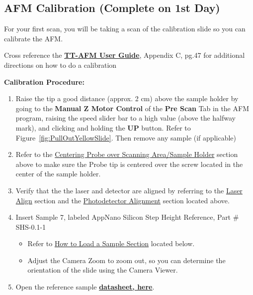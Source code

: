 \documentclass{../lab}
\begin{document}
\subsection{AFM Calibration (Complete on 1st Day)}

For your first scan, you will be taking a scan of the calibration slide so you can calibrate the AFM.

Cross reference the \href{http://experimentationlab.berkeley.edu/tt-afmuserguidev2.2}{\textbf{TT-AFM User Guide}}, Appendix C, pg.47 for additional directions on how to do a calibration

\textbf{Calibration Procedure:}

\begin{enumerate}
    \item Raise the tip a good distance (approx. 2 cm) above the sample holder by going to the \textbf{Manual Z Motor Control} of the \textbf{Pre Scan} Tab in the AFM program, raising the speed slider bar to a high value (above the halfway mark), and clicking and holding the \textbf{UP }button.  Refer to Figure~\ref{fig:PullOutYellowSlide}.  Then remove any sample (if applicable)

    \item Refer to the \hyperref[sec:Alignment]{Centering Probe over Scanning Area/Sample Holder} section above to make sure the Probe tip is centered over the screw located in the center of the sample holder.

    \item Verify that the the laser and detector are aligned by referring to the \hyperref[subsec:LaserAlign]{Laser Align} section and the \hyperref[subsec:PhotodetectorAlignment]{Photodetector Alignment} section located above.

    \item Insert Sample 7, labeled AppNano Silicon Step Height Reference, Part \# SHS-0.1-1

    \begin{itemize}
        \item Refer to \hyperref[subsec:HowToLoadASample]{How to Load a Sample Section} located below.

        \item Adjust the Camera Zoom to zoom out, so you can determine the orientation of the slide using the Camera Viewer.
    \end{itemize}

    \item Open the reference sample \href{http://experimentationlab.berkeley.edu/sites/default/files/AFMImages/Reference-\%20sample-SHS-01\_3\_datasheet.pdf}{\textbf{datasheet, here}}.


\end{enumerate}
\end{document}
